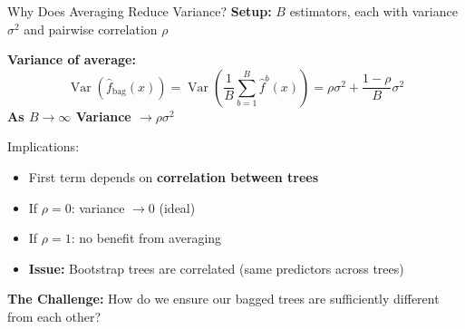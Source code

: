 \documentclass[10pt]{beamer}
\newcommand{\highlight}[1]{\textcolor{AccentOrange}{\textbf{#1}}}
\DeclareMathOperator{\Var}{Var}
\begin{document}
\begin{frame}{Why Does Averaging Reduce Variance?}
  \textbf{Setup:} $B$ estimators, each with variance $\sigma^2$ and pairwise correlation $\rho$

  \vspace{0.5em}
  \textbf{Variance of average:}
  \[
  \Var\left(\widehat{f}_{\text{bag}}(x)\right)=\Var\left(\frac{1}{B}\sum_{b=1}^{B} \widehat{f}^b(x)\right) = \rho\sigma^2 + \frac{1-\rho}{B}\sigma^2
  \]
  \vspace{0.5em}
  \textbf{As $B \to \infty$ Variance $\to \rho\sigma^2$}

  \vspace{0.5em}
Implications:
  \begin{itemize}
    \item First term depends on \highlight{correlation between trees}
    \item If $\rho = 0$: variance $\to 0$ (ideal)
    \item If $\rho = 1$: no benefit from averaging
    \item \textbf{Issue:} Bootstrap trees are correlated (same predictors across trees)
  \end{itemize}

  \vspace{0.5em}

  \textbf{The Challenge:} How do we ensure our bagged trees are sufficiently different from each other?

\end{frame}

\end{document}
